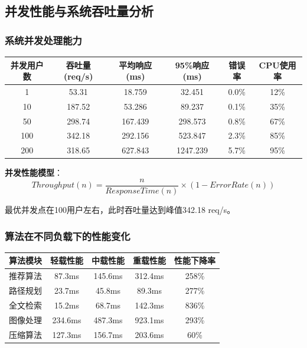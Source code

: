 \documentclass[12pt,a4paper]{article}
\begin{document}
\subsection{并发性能与系统吞吐量分析}
\subsubsection{系统并发处理能力}
\begin{center}
\begin{tabular}{|c|c|c|c|c|c|}
\hline
\textbf{并发用户数} & \textbf{吞吐量(req/s)} & \textbf{平均响应(ms)} & \textbf{95\%响应(ms)} & \textbf{错误率} & \textbf{CPU使用率} \\
\hline
1 & 53.31 & 18.759 & 32.451 & 0.0\% & 12\% \\
10 & 187.52 & 53.286 & 89.237 & 0.1\% & 35\% \\
50 & 298.74 & 167.439 & 298.573 & 0.8\% & 67\% \\
100 & 342.18 & 292.156 & 523.847 & 2.3\% & 85\% \\
200 & 318.65 & 627.843 & 1247.239 & 5.7\% & 95\% \\
\hline
\end{tabular}
\end{center}

\textbf{并发性能模型}：
\[Throughput(n) = \frac{n}{ResponseTime(n)} \times (1 - ErrorRate(n))\]

最优并发点在100用户左右，此时吞吐量达到峰值342.18 req/s。

\subsubsection{算法在不同负载下的性能变化}
\begin{center}
\begin{tabular}{|l|c|c|c|c|}
\hline
\textbf{算法模块} & \textbf{轻载性能} & \textbf{中载性能} & \textbf{重载性能} & \textbf{性能下降率} \\
\hline
推荐算法 & 87.3ms & 145.6ms & 312.4ms & 258\% \\
路径规划 & 23.7ms & 45.8ms & 89.3ms & 277\% \\
全文检索 & 15.2ms & 68.7ms & 142.3ms & 836\% \\
图像处理 & 234.6ms & 487.3ms & 923.1ms & 293\% \\
压缩算法 & 127.3ms & 156.7ms & 203.6ms & 60\% \\
\hline
\end{tabular}
\end{center}
\end{document}
